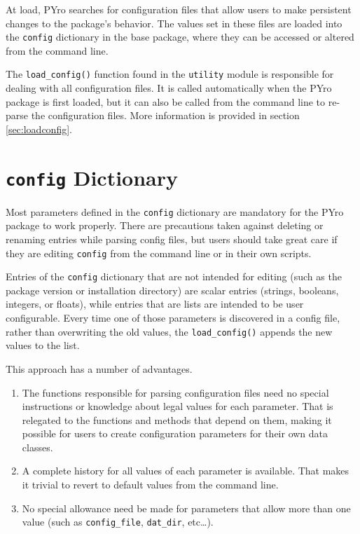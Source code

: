 At load, PYro searches for configuration files that allow users to make persistent changes to the package's behavior.  The values set in these files are loaded into the \verb|config| dictionary in the base package, where they can be accessed or altered from the command line.

The \verb|load_config()| function found in the \verb|utility| module is responsible for dealing with all configuration files.  It is called automatically when the PYro package is first loaded, but it can also be called from the command line to re-parse the configuration files.  More information is provided in section \ref{sec:loadconfig}.

\section{\texttt{config} Dictionary}
Most parameters defined in the \verb|config| dictionary are mandatory for the PYro package to work properly.  There are precautions taken against deleting or renaming entries while parsing config files, but users should take great care if they are editing \verb|config| from the command line or in their own scripts.

Entries of the \verb|config| dictionary that are not intended for editing (such as the package version or installation directory) are scalar entries (strings, booleans, integers, or floats), while entries that are lists are intended to be user configurable.  Every time one of those parameters is discovered in a config file, rather than overwriting the old values, the \verb|load_config()| appends the new values to the list.  

This approach has a number of advantages.
\begin{enumerate}
\item The functions responsible for parsing configuration files need no special instructions or knowledge about legal values for each parameter.  That is relegated to the functions and methods that depend on them, making it possible for users to create configuration parameters for their own data classes.
\item A complete history for all values of each parameter is available.  That makes it trivial to revert to default values from the command line.
\item No special allowance need be made for parameters that allow more than one value (such as \verb|config_file|, \verb|dat_dir|, etc\ldots).
\end{enumerate}


